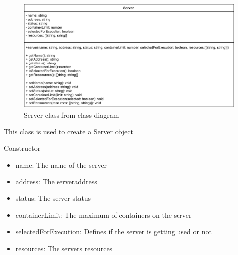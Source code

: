 
\begin{figure}[H]
\centerline{\includegraphics[scale=1]{res/Klassen/ServerClass.pdf}}
\caption{Server class from class diagram}
\end{figure}

This class is used to create a Server object

\begin{methodenv}{Constructor}



\begin{itemize}
	\item{name:}
	The name of the server
	\item{address:}
	The serveraddress
	\item{status:}
	The server status
	\item{containerLimit:}
	The maximum of containers on the server
	\item{selectedForExecution:}
	Defines if the server is getting used or not
	\item{resources:}
	The servers resources
\end{itemize}
\end{methodenv}


